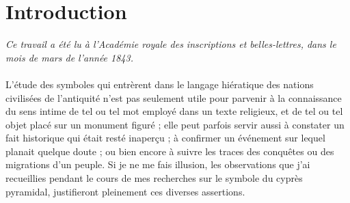 \documentclass[a4paper, 11pt, oneside, polutonikogreek, french]{article}
\begin{document}
\section*{Introduction}
\begin{center}
\emph{Ce travail a été lu à l'Académie royale des inscriptions et belles-lettres, dans le mois de mars de l'année 1843.}
\end{center}
\paragraph{}
L'étude des symboles qui entrèrent dans le langage hiératique des nations civilisées de l'antiquité n'est pas seulement utile pour parvenir à la connaissance du sens intime de tel ou tel mot employé dans un texte religieux, et de tel ou tel objet placé sur un monument figuré ; elle peut parfois servir aussi à constater un fait historique qui était resté inaperçu ; à confirmer un événement sur lequel planait quelque doute ; ou bien encore à suivre les traces des conquêtes ou des migrations d'un peuple. Si je ne me fais illusion, les observations que j'ai recueillies pendant le cours de mes recherches sur le symbole du cyprès pyramidal, justifieront pleinement ces diverses assertions.
\end{document}
